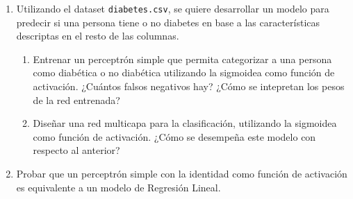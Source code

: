\documentclass[a4paper,11pt]{article}
\theoremstyle{definition}
\begin{document}
\begin{enumerate}
\item Utilizando el dataset \verb|diabetes.csv|, se quiere desarrollar un modelo para predecir si una persona tiene o no diabetes en base a las características descriptas en el resto de las columnas.
\begin{enumerate}
    \item Entrenar un perceptrón simple que permita categorizar a una persona como diabética o no diabética utilizando la sigmoidea como función de activación. ¿Cuántos falsos negativos hay? ¿Cómo se intepretan los pesos de la red entrenada?
    \item Diseñar una red multicapa para la clasificación, utilizando la sigmoidea como función de activación. ¿Cómo se desempeña este modelo con respecto al anterior?
\end{enumerate}

\item Probar que un perceptrón simple con la identidad como función de activación es equivalente a un modelo de Regresión Lineal.



\end{enumerate}
\end{document}
